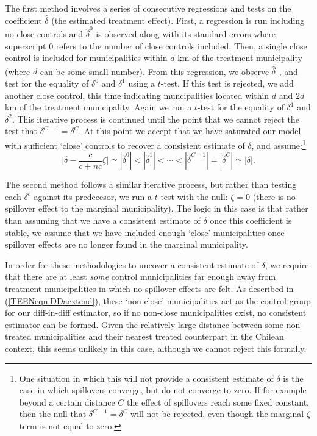 The first method involves a series of consecutive regressions and tests on the
coefficient $\widehat\delta$ (the estimated treatment effect).  First, a 
regression is run including no close
controls and $\hat\delta^0$ is observed along with its standard errors where 
superscript 0 refers to the number of close controls included.  Then, a single
close control is included for municipalities within $d$ km of the treatment
municipality (where $d$ can be some small number).  From this regression, we
observe $\hat\delta^1$, and test for the equality of $\delta^0$  and $\delta^1$ 
using a $t$-test.  If this test is rejected, we add another close control, 
this time indicating muncipalities located within $d$ and $2d$ km of the 
treatment municipality.  Again we run a $t$-test for the equality of $\delta^1$ 
and $\delta^2$.  This iterative process is continued until the point that we 
cannot reject the test that $\delta^{C-1}=\delta^C$.  At this point we accept 
that we have saturated our model with sufficient `close' controls to recover 
a consistent estimate of $\delta$, and assume:\footnote{One situation in which 
this will not provide a consistent estimate of $\delta$ is the case in which 
spillovers converge, but do not converge to zero.  If for example beyond a 
certain distance $C$ the effect of spillovers reach some fixed constant, then 
the null that $\delta^{C-1}=\delta^C$ will not be rejected, even though the 
marginal $\zeta$ term is not equal to zero.}
\begin{equation}
\bigg|\delta-\frac{c}{c+nc}\zeta\bigg|\simeq|\hat\delta^0|<|\hat\delta^1|<\cdots<
|\hat\delta^{C-1}|=|\hat\delta^C|\simeq|\delta|.
\end{equation}

The second method follows a similar iterative process, but rather than testing
each $\delta^c$ against its predecesor, we run a $t$-test with the null:
$\zeta=0$ (there is no spillover effect to the marginal municipality).  The logic
 in this case is that rather than assuming that we have a consistent estimate of 
$\delta$ once this coefficient is stable, we assume that we have included enough 
`close' municipalities once spillover effects are no longer found in the marginal 
municipality.

In order for these methodologies to uncover a consistent estimate of $\delta$,
we require that there are at least \emph{some} control municipalities far enough 
away from treatment municipalities in which no spillover effects are felt.  As 
described in (\ref{TEENeqn:DDaextend}), these `non-close' municipalities act as 
the control group for our diff-in-diff estimator, so if no non-close municipalities 
exist, no consistent estimator can be formed.  Given the relatively large distance 
between some non-treated municipalities and their nearest treated counterpart in 
the Chilean context, this seems unlikely in this case, although we cannot reject 
this formally.

